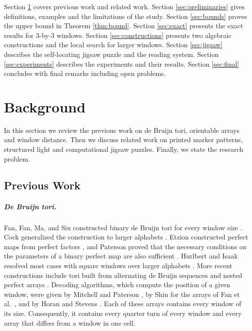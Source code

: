 \documentclass{lipics-v2021}
\begin{document}
Section \ref{sec:background} covers previous work and related work.
Section \ref{sec:preliminaries} gives definitions, examples and the limitations of the study.
Section \ref{sec:bounds} proves the upper bound in Theorem \ref{thm:bound}.
Section \ref{sec:exact} presents the exact results for $3$-by-$3$ windows.
Section \ref{sec:constructions} presents two algebraic constructions and the local search for larger windows.
Section \ref{sec:jigsaw} describes the self-locating jigsaw puzzle and the reading system.
Section \ref{sec:experiments} describes the experiments and their results.
Section \ref{sec:final} concludes with final remarks including open problems.


\section{Background}
\label{sec:background}

In this section we review the previous work on de Bruijn tori, orientable arrays and window distance.
Then we discuss related work on printed marker patterns, structured light and computational jigsaw puzzles.
Finally, we state the research problem.

\subsection{Previous Work}
\label{sec:background_previous}

\subparagraph*{De Bruijn tori.}
Fan, Fan, Ma, and Siu constructed binary de Bruijn tori for every window size \cite{fan85debruijn}.
Cock generalized the construction to larger alphabets \cite{cock1988toroidal}.
Etzion constructed perfect maps from perfect factors \cite{etzion1988constructions}, and Paterson proved that the necessary conditions on the parameters of a binary perfect map are also sufficient \cite{paterson1994perfect}.
Hurlbert and Isaak resolved most cases with square windows over larger alphabets \cite{hurlbert1993bruijn,hurlbert1995new}.
More recent constructions include tori built from alternating de Bruijn sequences \cite{kreitzer2024alternating} and nested perfect arrays \cite{becher2024nested}.
Decoding algorithms, which compute the position of a given window, were given by Mitchell and Paterson \cite{mitchell1994decoding}, by Shiu for the arrays of Fan et al.\ \cite{shiu1997decoding}, and by Horan and Stevens \cite{horan2016locating}.
Each of these arrays contains every window of its size.
Consequently, it contains every quarter turn of every window and every array that differs from a window in one cell.
\end{document}
